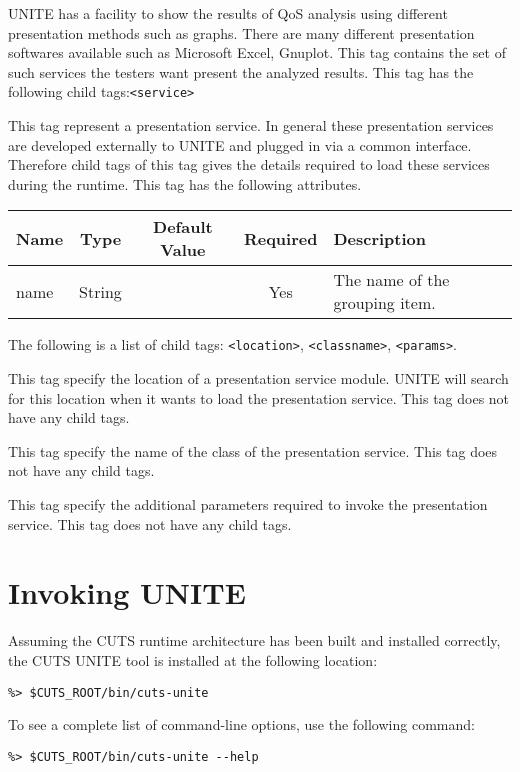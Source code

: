 
UNITE has a facility to show the results of QoS analysis using different 
presentation methods such as graphs. There are many different presentation 
softwares available such as Microsoft Excel, Gnuplot. This tag contains the 
set of such services the testers want present the analyzed results. This tag has 
the following child tags:\texttt{<service>}


This tag represent a presentation service. In general these presentation services 
are developed externally to UNITE and plugged in via a common interface.
Therefore child tags of this tag gives the details required to load these services 
during the runtime. This tag has the following attributes.

\begin{table}
 \begin{tabular}{lcccl}
  \hline
  \textbf{Name} & \textbf{Type} & \textbf{Default Value} & \textbf{Required} & \textbf{Description} \\
  \hline
  name & String  & & Yes & The name of the grouping item. \\
  \end{tabular}
\end{table}

\noindent The following is a list of child tags:
\texttt{<location>}, \texttt{<classname>}, \texttt{<params>}.


This tag specify the location of a presentation service module. UNITE 
will search for this location when it wants to load the presentation 
service. This tag does not have any child tags.


This tag specify the name of the class of the presentation 
service. This tag does not have any child tags.


This tag specify the additional parameters required to invoke 
the presentation service. This tag does not have any child tags.

\section{Invoking UNITE}
\label{sec:unite-invoke}

Assuming the CUTS runtime architecture has been built and installed 
correctly, the CUTS UNITE tool is installed at the following 
location:
\begin{lstlisting}
%> $CUTS_ROOT/bin/cuts-unite
\end{lstlisting}
To see a complete list of command-line options, use the following 
command:
\begin{lstlisting}
%> $CUTS_ROOT/bin/cuts-unite --help
\end{lstlisting}

